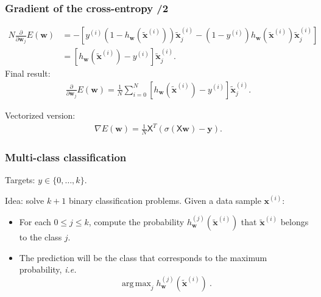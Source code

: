 \documentclass{beamer}
\DeclareMathOperator*{\argmax}{arg\,max}
\begin{document}
	\begin{frame}
		\frametitle{Gradient of the cross-entropy /2}
		\begin{align*}
			N\frac{\partial}{\partial \bm{w}_j} E(\bm{w})&= -[y^{(i)}(1 - h_{\bm{w}}(\tilde{\bm{x}}^{(i)}))\tilde{\bm{x}}^{(i)}_j - (1-y^{(i)})h_{\bm{w}}(\tilde{\bm{x}}^{(i)})\tilde{\bm{x}}^{(i)}_j]\\
			& = [h_{\bm{w}}(\tilde{\bm{x}}^{(i)})- y^{(i)}]\tilde{\bm{x}}^{(i)}_j.
		\end{align*}
	Final result:
		\begin{align*}
			\frac{\partial}{\partial \bm{w}_j} E(\bm{w}) = \frac{1}{N} \sum_{i=0}^{N} [h_{\bm{w}}(\tilde{\bm{x}}^{(i)})- y^{(i)}]\tilde{\bm{x}}^{(i)}_j.
		\end{align*}
	
	Vectorized version:
	\begin{align*}
		\nabla E(\bm{w}) = \frac{1}{N} \mathsf{X}^T(\sigma(\mathsf{X}\bm{w}) - \bm{y}).
	\end{align*}
	
	\end{frame}

	\begin{frame}
		\frametitle{Multi-class classification}
		
		Targets: $y \in \{0, \dots, k\}$.
		
		\vspace{5mm}
		
		Idea: solve $k+1$ binary classification problems. Given a data sample $\bm{x}^{(i)}$:
		\begin{itemize}
			\item For each $0\leq j \leq k$, compute the probability $h^{(j)}_{\bm{w}}(\tilde{\bm{x}}^{(i)})$ that $\tilde{\bm{x}}^{(i)}$ belongs to the class $j$.
			\item The prediction will be the class that corresponds to the maximum probability, \textit{i.e.} 
			$$\argmax_j h^{(j)}_{\bm{w}}(\tilde{\bm{x}}^{(i)})\ .$$
		\end{itemize}
		
		
	\end{frame}
\end{document}
